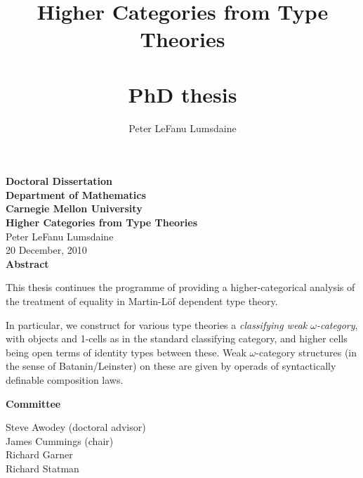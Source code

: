 \documentclass[11pt]{amsbook}
\begin{document}
\frontmatter



\title{Higher Categories from Type Theories \\~\\ \normalsize PhD thesis}

\author[P. LeF. Lumsdaine]{Peter LeFanu Lumsdaine}


\maketitle

\newpage
\thispagestyle{empty}
\begin{center}
  {\large\textbf{Doctoral Dissertation \\ Department of Mathematics \\ Carnegie Mellon University}}\\
  \vspace{0.8cm}
  {\Large\textbf{Higher Categories from Type Theories}}\\
  \vspace{.4cm}
  Peter LeFanu Lumsdaine\\
  20 December, 2010\\
  \vspace{1.6cm}
  \textbf{Abstract} \\
\end{center}
This thesis continues the programme of providing a higher-categorical analysis of the treatment of equality in Martin-Löf dependent type theory.

In particular, we construct for various type theories a \emph{classifying weak $\omega$-category}, with objects and 1-cells as in the standard classifying category, and higher cells being open terms of identity types between these.  Weak $\omega$-category structures (in the sense of Batanin/Leinster) on these are given by operads of syntactically definable composition laws.
\begin{center}  
  \vspace{1.6cm}
  \textbf{Committee}
  
  Steve Awodey (doctoral advisor)\\
  James Cummings (chair) \\
  Richard Garner \\
  Richard Statman \\

\end{center}
 
\end{document}
